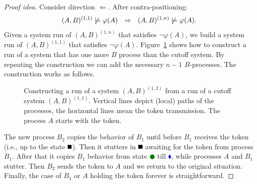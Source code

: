 \begin{proof}[Proof idea]
    Consider direction $\Leftarrow$. After contra-positioning:
    $$
    (A,B)^{(1,1)} \not\models \varphi(A) ~~\Rightarrow~~ (A,B)^{(1,n)} \not\models \varphi(A).
    $$
    Given a system run of $(A,B)^{(1,n)}$ that satisfies $\neg\varphi(A)$,
    we build a system run of $(A,B)^{(1,1)}$ that satisfies $\neg\varphi(A)$.
    Figure~\ref{amba:fig:simulation_proof_2} shows how to construct a run of a system
    that has one more $B$ process than the cutoff system.
    By repeating the construction we can add the necessary $n-1$ $B$-processes.
    The construction works as follows.
    \begin{figure}[t]
      \caption{Constructing a run of a system $(A,B)^{(1,2)}$ from a run of a cutoff system $(A,B)^{(1,1)}$.
        Vertical lines depict (local) paths of the processes,
        the horizontal lines mean the token transmission.
        The process $A$ starts with the token.%
      }
      \label{amba:fig:simulation_proof_2}
    \end{figure}
    The new process $B_2$ copies the behavior of $B_1$ until before $B_1$ receives the token
    (i.e., up to the state \textcolor{green}{$\rule{0.6em}{0.6em}$}).
    Then it stutters in \textcolor{green}{$\rule{0.6em}{0.6em}$} awaiting for the token from process $B_1$.
    After that it copies $B_1$ behavior from state \textcolor{green}{$\CIRCLE$} till \textcolor{blue}{$\blacklozenge$},
    while processes $A$ and $B_1$ stutter.
    Then $B_2$ sends the token to $A$ and we return to the original situation.
    Finally, the case of $B_1$ or $A$ holding the token forever is straightforward.


\end{proof}
